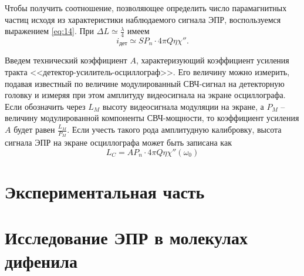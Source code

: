 Чтобы получить соотношение, позволяющее определить число  парамагнитных частиц исходя из характеристики наблюдаемого сигнала ЭПР, воспользуемся выражением \eqref{eq:14}. При $\Delta L \simeq \frac{\lambda}{4}$ имеем
\begin{equation}
    \label{eq:15}
    i_{\text{дет}} \simeq S P_n \cdot 4 \pi Q \eta \chi''.
\end{equation}

Введем технический коэффициент $A$, характеризующий коэффициент усиления тракта <<детектор-усилитель-осциллограф>>. Его величину можно измерить, подавая известный по величине модулированный СВЧ-сигнал на детекторную головку и измеряя при этом амплитуду видеосигнала на экране осциллографа. Если обозначить через  $L_M$ высоту видеосигнала модуляции 
на экране, а $P_M$ -- величину модулированной компоненты СВЧ-мощности, то коэффициент усиления $A$ будет равен  $\frac{L_M}{P_M}$. Если учесть такого рода амплитудную калибровку, высота сигнала ЭПР на экране осциллографа может быть записана как
\begin{equation}
    \label{eq:16}
    L_{C} = A P_n \cdot 4 \pi Q \eta \chi''(\omega_{0})
\end{equation}
\section{Экспериментальная часть}%


\section{Исследование ЭПР в молекулах дифенила}%
